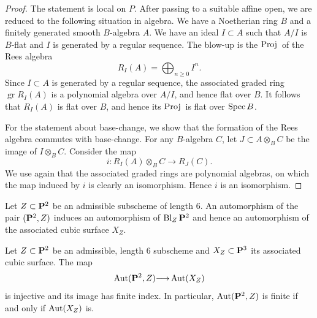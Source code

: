 \documentclass[12pt,reqno]{amsart}
\DeclareMathOperator{\Bl}{Bl}
\renewcommand{\to}{{\longrightarrow}}
\numberwithin{equation}{section}
\newcommand{\Proj}{{\text{\rm Proj}\,}}
\begin{document}
\begin{proof}
  The statement is local on $P$.
  After passing to a suitable affine open, we are reduced to the following situation in algebra.
  We have a Noetherian ring $B$ and a finitely generated smooth $B$-algebra $A$.
  We have an ideal $I \subset A$ such that $A/I$ is $B$-flat and $I$ is generated by a regular sequence.
  The blow-up is the $\Proj$ of the Rees algebra
  \[R_I(A) = \bigoplus_{n \geq 0}I^n.\]
  Since $I \subset A$ is generated by a regular sequence, the associated graded ring $\operatorname{gr} R_I(A)$ is a polynomial algebra over $A/I$, and hence flat over $B$.
  It follows that $R_I(A)$ is flat over $B$, and hence its $\Proj$ is flat over $\spec B$.
  
  For the statement about base-change, we show that the formation of the Rees algebra commutes with base-change.
  For any $B$-algebra $C$, let $J \subset A \otimes_B C$ be the image of $I \otimes_B C$.
  Consider the map
  \[ i \colon R_I(A) \otimes_B C \to R_J(C).\]
  We use again that the associated graded rings are polynomial algebras, on which the map induced by $i$ is clearly an isomorphism.
  Hence $i$ is an isomorphism.
\end{proof}


Let $Z \subset \P^2$ be an admissible subscheme of length 6.
An automorphism of the pair $(\P^2, Z)$ induces an automorphism of $\Bl_Z\P^2$ and hence an automorphism of the associated cubic surface $X_Z$.

\begin{proposition}
  \label{prop:good} Let $Z \subset \P^2$ be an admissible, length $6$
  subscheme and $X_Z \subset \P^3$ its associated cubic surface.
  The map
  \[ \Aut(\P^2, Z) \to \Aut(X_Z)\]
  is injective and its image has finite index.
  In particular, $\Aut(\P^2, Z)$ is finite if and only if $\Aut(X_Z)$ is.
\end{proposition}
\end{document}

